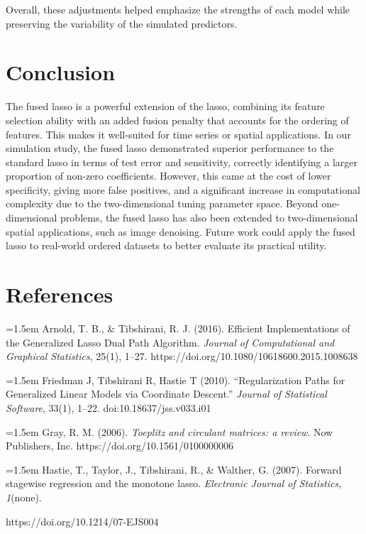 \documentclass[12pt]{article}
\begin{document}
Overall, these adjustments helped emphasize the strengths of each model while preserving the variability of the simulated predictors.

\section{Conclusion}

The fused lasso is a powerful extension of the lasso, combining its feature selection ability with an added fusion penalty that accounts for the ordering of features. This makes it well-suited for time series or spatial applications. In our simulation study, the fused lasso demonstrated superior performance to the standard lasso in terms of test error and sensitivity, correctly identifying a larger proportion of non-zero coefficients. However, this came at the cost of lower specificity, giving more false positives, and a significant increase in computational complexity due to the two-dimensional tuning parameter space. Beyond one-dimensional problems, the fused lasso has also been extended to two-dimensional spatial applications, such as image denoising. Future work could apply the fused lasso to real-world ordered datasets to better evaluate its practical utility.

\section{References}

\noindent
\hangindent=1.5em
Arnold, T. B., \& Tibshirani, R. J. (2016). Efficient Implementations of the Generalized Lasso Dual Path Algorithm. \textit{Journal of Computational and Graphical Statistics}, 25(1), 1–27. https://doi.org/10.1080/10618600.2015.1008638

\noindent
\hangindent=1.5em
Friedman J, Tibshirani R, Hastie T (2010). “Regularization Paths for Generalized Linear Models via Coordinate Descent.” \textit{Journal of Statistical Software}, 33(1), 1–22. doi:10.18637/jss.v033.i01

\noindent
\hangindent=1.5em
Gray, R. M. (2006). \textit{Toeplitz and circulant matrices: a review}. Now Publishers, Inc. https://doi.org/10.1561/0100000006

\noindent
\hangindent=1.5em
Hastie, T., Taylor, J., Tibshirani, R., \& Walther, G. (2007). Forward stagewise regression and the monotone lasso. \textit{Electronic Journal of Statistics, 1}(none). 

https://doi.org/10.1214/07-EJS004
\end{document}
